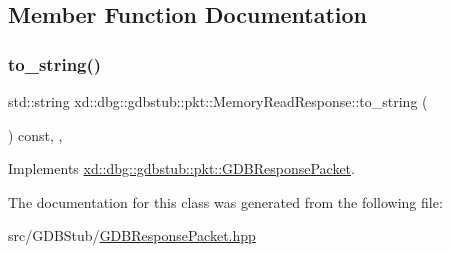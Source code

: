 \subsection{Member Function Documentation}
\mbox{\label{classxd_1_1dbg_1_1gdbstub_1_1pkt_1_1_memory_read_response_aedaabcefd9d9d5e5182c110f7321be6e}} 
\subsubsection{\texorpdfstring{to\+\_\+string()}{to\_string()}}
{\footnotesize\ttfamily std\+::string xd\+::dbg\+::gdbstub\+::pkt\+::\+Memory\+Read\+Response\+::to\+\_\+string (\begin{DoxyParamCaption}{ }\end{DoxyParamCaption}) const\hspace{0.3cm}{\ttfamily [inline]}, {\ttfamily [override]}, {\ttfamily [virtual]}}



Implements \mbox{\hyperlink{classxd_1_1dbg_1_1gdbstub_1_1pkt_1_1_g_d_b_response_packet_a2a15795536cd5ff94f0533c406233874}{xd\+::dbg\+::gdbstub\+::pkt\+::\+G\+D\+B\+Response\+Packet}}.



The documentation for this class was generated from the following file\+:\begin{DoxyCompactItemize}
\item 
src/\+G\+D\+B\+Stub/\mbox{\hyperlink{_g_d_b_response_packet_8hpp}{G\+D\+B\+Response\+Packet.\+hpp}}\end{DoxyCompactItemize}

